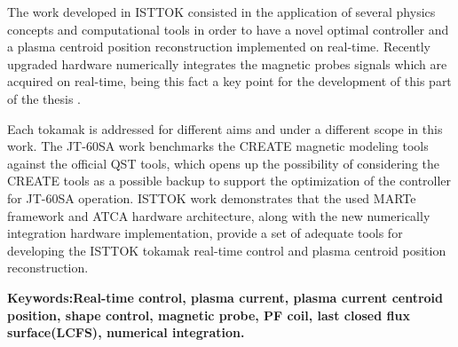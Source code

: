  The work developed in ISTTOK consisted in the application of several physics concepts and computational tools in order to have a novel optimal controller and a plasma centroid position reconstruction implemented on real-time. Recently upgraded hardware numerically integrates  the magnetic probes signals which are acquired on real-time, being this fact a key point for the development of this part of the thesis .\smallskip
 

 

Each tokamak is addressed for different aims and under a different scope in this work. The JT-60SA work benchmarks the CREATE magnetic modeling tools against the official QST tools, which opens up the possibility of considering the CREATE tools as a possible backup to support the optimization of the controller for JT-60SA operation. ISTTOK work demonstrates that the used MARTe framework and ATCA hardware architecture, along with the new numerically integration hardware implementation, provide a set of adequate tools for developing the ISTTOK tokamak real-time control and plasma centroid position reconstruction.
 


\textbf{Keywords:Real-time control, plasma current, plasma current centroid position,   shape control, magnetic probe, PF coil, last closed flux surface(LCFS), numerical integration.} 


